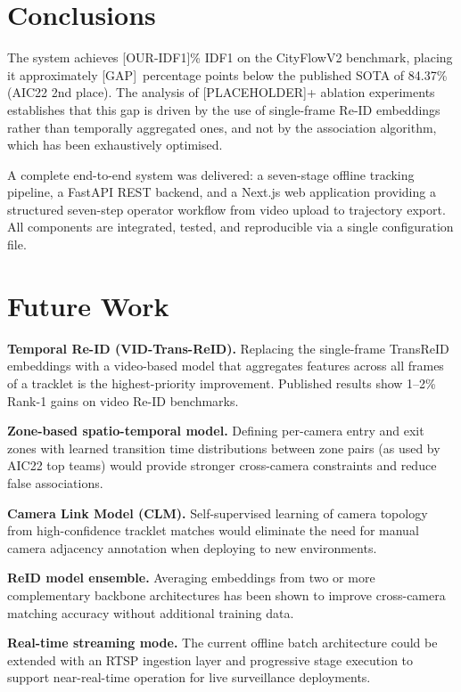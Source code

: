 \section{Conclusions}

The system achieves [OUR-IDF1]\% IDF1 on the CityFlowV2 benchmark, placing it approximately [GAP]~percentage points below the published SOTA of 84.37\% (AIC22 2nd place). The analysis of [PLACEHOLDER]+ ablation experiments establishes that this gap is driven by the use of single-frame Re-ID embeddings rather than temporally aggregated ones, and not by the association algorithm, which has been exhaustively optimised.

A complete end-to-end system was delivered: a seven-stage offline tracking pipeline, a FastAPI REST backend, and a Next.js web application providing a structured seven-step operator workflow from video upload to trajectory export. All components are integrated, tested, and reproducible via a single configuration file.

\section{Future Work}

\textbf{Temporal Re-ID (VID-Trans-ReID).} Replacing the single-frame TransReID embeddings with a video-based model that aggregates features across all frames of a tracklet is the highest-priority improvement. Published results show 1--2\% Rank-1 gains on video Re-ID benchmarks.

\textbf{Zone-based spatio-temporal model.} Defining per-camera entry and exit zones with learned transition time distributions between zone pairs (as used by AIC22 top teams) would provide stronger cross-camera constraints and reduce false associations.

\textbf{Camera Link Model (CLM).} Self-supervised learning of camera topology from high-confidence tracklet matches would eliminate the need for manual camera adjacency annotation when deploying to new environments.

\textbf{ReID model ensemble.} Averaging embeddings from two or more complementary backbone architectures has been shown to improve cross-camera matching accuracy without additional training data.

\textbf{Real-time streaming mode.} The current offline batch architecture could be extended with an RTSP ingestion layer and progressive stage execution to support near-real-time operation for live surveillance deployments.
